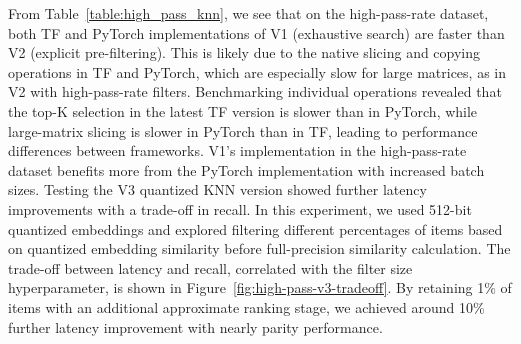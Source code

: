 

From Table~\ref{table:high_pass_knn}, we see that on the high-pass-rate dataset, both TF and PyTorch implementations of V1 (exhaustive search) are faster than V2 (explicit pre-filtering). This is likely due to the native slicing and copying operations in TF and PyTorch, which are especially slow for large matrices, as in V2 with high-pass-rate filters. Benchmarking individual operations revealed that the top-K selection in the latest TF version is slower than in PyTorch, while large-matrix slicing is slower in PyTorch than in TF, leading to performance differences between frameworks. V1's implementation in the high-pass-rate dataset benefits more from the PyTorch implementation with increased batch sizes. Testing the V3 quantized KNN version showed further latency improvements with a trade-off in recall. In this experiment, we used 512-bit quantized embeddings and explored filtering different percentages of items based on quantized embedding similarity before full-precision similarity calculation. The trade-off between latency and recall, correlated with the filter size hyperparameter, is shown in Figure~\ref{fig:high-pass-v3-tradeoff}. By retaining 1\% of items with an additional approximate ranking stage, we achieved around 10\% further latency improvement with nearly parity performance.


